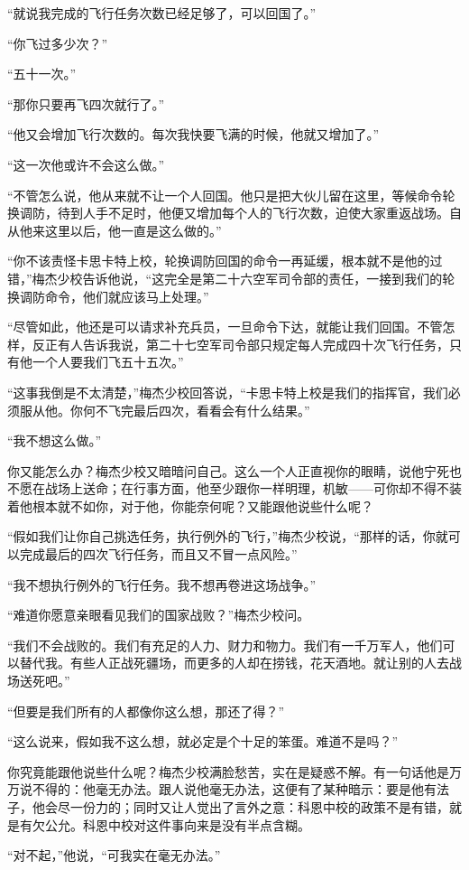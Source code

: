     “就说我完成的飞行任务次数已经足够了，可以回国了。”

    “你飞过多少次？”

    “五十一次。”

    “那你只要再飞四次就行了。”

    “他又会增加飞行次数的。每次我快要飞满的时候，他就又增加了。”

    “这一次他或许不会这么做。”

    “不管怎么说，他从来就不让一个人回国。他只是把大伙儿留在这里，等候命令轮换调防，待到人手不足时，他便又增加每个人的飞行次数，迫使大家重返战场。自从他来这里以后，他一直是这么做的。”

    “你不该责怪卡思卡特上校，轮换调防回国的命令一再延缓，根本就不是他的过错，”梅杰少校告诉他说，“这完全是第二十六空军司令部的责任，一接到我们的轮换调防命令，他们就应该马上处理。”

    “尽管如此，他还是可以请求补充兵员，一旦命令下达，就能让我们回国。不管怎样，反正有人告诉我说，第二十七空军司令部只规定每人完成四十次飞行任务，只有他一个人要我们飞五十五次。”

    “这事我倒是不太清楚，”梅杰少校回答说，“卡思卡特上校是我们的指挥官，我们必须服从他。你何不飞完最后四次，看看会有什么结果。”

    “我不想这么做。”

    你又能怎么办？梅杰少校又暗暗问自己。这么一个人正直视你的眼睛，说他宁死也不愿在战场上送命；在行事方面，他至少跟你一样明理，机敏——可你却不得不装着他根本就不如你，对于他，你能奈何呢？又能跟他说些什么呢？

    “假如我们让你自己挑选任务，执行例外的飞行，”梅杰少校说，“那样的话，你就可以完成最后的四次飞行任务，而且又不冒一点风险。”

    “我不想执行例外的飞行任务。我不想再卷进这场战争。”

    “难道你愿意亲眼看见我们的国家战败？”梅杰少校问。

    “我们不会战败的。我们有充足的人力、财力和物力。我们有一千万军人，他们可以替代我。有些人正战死疆场，而更多的人却在捞钱，花天酒地。就让别的人去战场送死吧。”

    “但要是我们所有的人都像你这么想，那还了得？”

    “这么说来，假如我不这么想，就必定是个十足的笨蛋。难道不是吗？”

    你究竟能跟他说些什么呢？梅杰少校满脸愁苦，实在是疑惑不解。有一句话他是万万说不得的：他毫无办法。跟人说他毫无办法，这便有了某种暗示：要是他有法子，他会尽一份力的；同时又让人觉出了言外之意：科恩中校的政策不是有错，就是有欠公允。科恩中校对这件事向来是没有半点含糊。

    “对不起，”他说，“可我实在毫无办法。”
